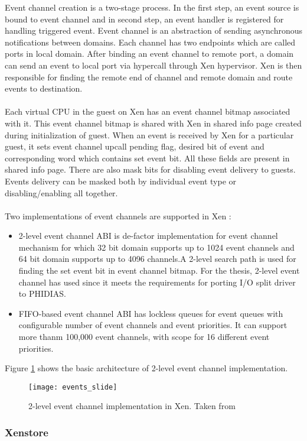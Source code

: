 Event channel creation is a two-stage process. In the first step, an event source is bound to event channel and in second step, an event handler is registered for handling triggered event. Event channel is an abstraction of sending asynchronous notifications between domains. Each channel has two endpoints which are called ports in local domain. After binding an event channel to remote port, a domain can send an event to local port via hypercall through Xen hypervisor. Xen is then responsible for finding the remote end of channel and remote domain and route events to destination.
\\
\\
Each virtual CPU in the guest on Xen has an event channel bitmap associated with it. This event channel bitmap is shared with Xen in shared info page created during initialization of guest. When an event is received by Xen for a particular guest, it sets event channel upcall pending flag, desired bit of event and corresponding word which contains set event bit. All these fields are present in shared info page. There are also mask bits for disabling event delivery to guests. Events delivery can be masked both by individual event type or disabling/enabling all together.
\\
\\
Two implementations of event channels are supported in Xen \cite{xen_events}:
\begin{itemize}
	\item 2-level event channel ABI is de-factor implementation for event channel mechanism for which 32 bit domain supports up to 1024 event channels and 64 bit domain supports up to 4096 channels.A 2-level search path is used for finding the set event bit in event channel bitmap. For the thesis, 2-level event channel has used since it meets the requirements for porting I/O split driver to PHIDIAS.
	\item FIFO-based event channel ABI has lockless queues for event queues with configurable number of event channels and event priorities. It can support more thanm 100,000 event channels, with scope for  16 different event priorities.
\end{itemize}
Figure \ref{events_slide} shows the basic architecture of 2-level event channel implementation.

\begin{figure}[!htbp]
	\centering
	\texttt{[image: events\_slide]}
	\caption{2-level event channel implementation in Xen. Taken from \cite{events_slide}}
	\label{events_slide}
\end{figure}
\subsubsection{Xenstore \label{sec:xenstore}}

